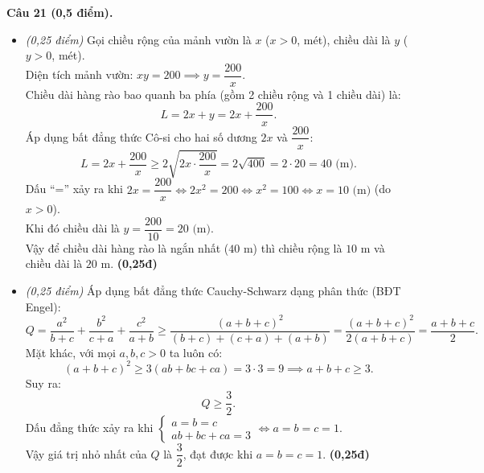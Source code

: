 \documentclass[11pt,a4paper]{article}
\begin{document}
\vspace{2mm}
\noindent
\textbf{Câu 21 (0,5 điểm).}
\begin{itemize}
  \item[a)] \textit{(0,25 điểm)}
  Gọi chiều rộng của mảnh vườn là $x$ ($x > 0$, mét), chiều dài là $y$ ($y > 0$, mét).\\
  Diện tích mảnh vườn: $xy = 200 \implies y = \dfrac{200}{x}$.\\
  Chiều dài hàng rào bao quanh ba phía (gồm 2 chiều rộng và 1 chiều dài) là:
  \[
  L = 2x + y = 2x + \dfrac{200}{x}.
  \]
  Áp dụng bất đẳng thức Cô-si cho hai số dương $2x$ và $\dfrac{200}{x}$:
  \[
  L = 2x + \dfrac{200}{x} \ge 2\sqrt{2x \cdot \dfrac{200}{x}} = 2\sqrt{400} = 2 \cdot 20 = 40\text{ (m)}.
  \]
  Dấu ``='' xảy ra khi $2x = \dfrac{200}{x} \iff 2x^2 = 200 \iff x^2 = 100 \iff x = 10\text{ (m)}$ (do $x > 0$).\\
  Khi đó chiều dài là $y = \dfrac{200}{10} = 20\text{ (m)}$.\\
  Vậy để chiều dài hàng rào là ngắn nhất ($40\text{ m}$) thì chiều rộng là $10\text{ m}$ và chiều dài là $20\text{ m}$. \dotfill \textbf{(0,25đ)}

  \item[b)] \textit{(0,25 điểm)}
  Áp dụng bất đẳng thức Cauchy-Schwarz dạng phân thức (BĐT Engel):
  \[
  Q = \dfrac{a^2}{b+c} + \dfrac{b^2}{c+a} + \dfrac{c^2}{a+b} \ge \dfrac{(a+b+c)^2}{(b+c) + (c+a) + (a+b)} = \dfrac{(a+b+c)^2}{2(a+b+c)} = \dfrac{a+b+c}{2}.
  \]
  Mặt khác, với mọi $a, b, c > 0$ ta luôn có:
  \[
  (a+b+c)^2 \ge 3(ab+bc+ca) = 3 \cdot 3 = 9 \implies a+b+c \ge 3.
  \]
  Suy ra:
  \[
  Q \ge \dfrac{3}{2}.
  \]
  Dấu đẳng thức xảy ra khi $\begin{cases} a = b = c \\ ab+bc+ca=3 \end{cases} \iff a = b = c = 1$.\\
  Vậy giá trị nhỏ nhất của $Q$ là $\dfrac{3}{2}$, đạt được khi $a = b = c = 1$. \dotfill \textbf{(0,25đ)}
\end{itemize}
\end{document}
